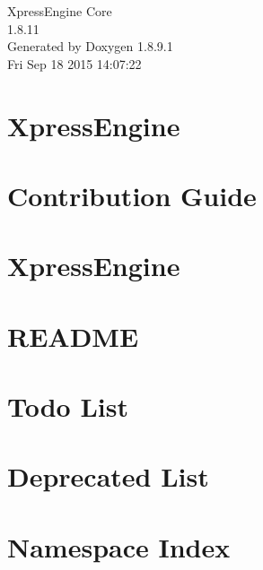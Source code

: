 \documentclass[twoside]{book}
\newcommand{\+}{\discretionary{\mbox{\scriptsize$\hookleftarrow$}}{}{}}
\newcommand{\clearemptydoublepage}{%
  \newpage{\pagestyle{empty}\cleardoublepage}%
}
\begin{document}
\hypersetup{pageanchor=false,
             bookmarks=true,
             bookmarksnumbered=true,
             pdfencoding=unicode
            }
\begin{titlepage}
\vspace*{7cm}
\begin{center}%
{\Large Xpress\+Engine Core \\[1ex]\large 1.\+8.\+11 }\\
\vspace*{1cm}
{\large Generated by Doxygen 1.8.9.1}\\
\vspace*{0.5cm}
{\small Fri Sep 18 2015 14:07:22}\\
\end{center}
\end{titlepage}
\clearemptydoublepage
\tableofcontents
\clearemptydoublepage
{}
\hypersetup{pageanchor=true}

\chapter{Xpress\+Engine}
\label{index}\hypertarget{index}{}
\chapter{Contribution Guide}
\label{md_CONTRIBUTING}
\hypertarget{md_CONTRIBUTING}{}

\chapter{Xpress\+Engine}
\label{md_README}
\hypertarget{md_README}{}

\chapter{R\+E\+A\+D\+M\+E}
\label{md_xe-manual-api_README}
\hypertarget{md_xe-manual-api_README}{}

\chapter{Todo List}
\label{todo}
\hypertarget{todo}{}

\chapter{Deprecated List}
\label{deprecated}
\hypertarget{deprecated}{}

\chapter{Namespace Index}

\end{document}

